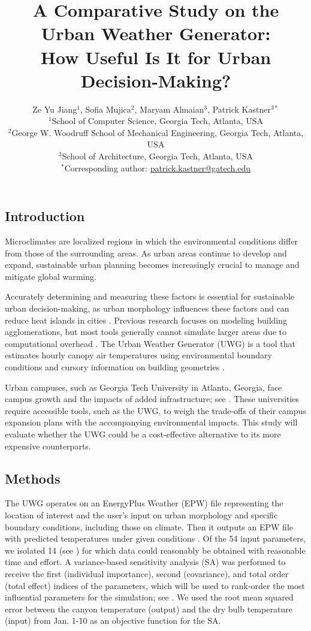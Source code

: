 \documentclass[a4paper, 12pt]{article}
\title{\large\textbf{A Comparative Study on the Urban Weather Generator:\\How Useful Is It for Urban Decision-Making?}}
\author{
\normalsize
Ze Yu Jiang$^{1}$, Sofia Mujica$^{2}$, Maryam Almaian$^{3}$, Patrick Kastner$^{3*}$\\
        \small $^{1}$School of Computer Science, Georgia Tech, Atlanta, USA \\
        \small $^{2}$George W. Woodruff School of Mechanical Engineering, Georgia Tech, Atlanta, USA \\
        \small $^{3}$School of Architecture, Georgia Tech, Atlanta, USA \\
        \small $^{*}$Corresponding author: \href{patrick.kastner@gatech.edu}{patrick.kastner@gatech.edu} \\
}
\date{}
\begin{document}
\maketitle
\thispagestyle{fancy} %

\vspace{-1.5cm}

\subsection*{Introduction}

Microclimates are localized regions in which the environmental conditions differ from those of the surrounding areas. 
As urban areas continue to develop and expand, sustainable urban planning becomes increasingly crucial to manage and mitigate global warming.


Accurately determining and measuring these factors is essential for sustainable urban decision-making, as urban morphology influences these factors and can reduce heat islands in cities \citep{tehrani_predicting_2024}.
Previous research focuses on modeling building agglomerations, but most tools generally cannot simulate larger areas due to computational overhead \citep{singh_recent_2024}.
The Urban Weather Generator (UWG) is a tool that estimates hourly canopy air temperatures using environmental boundary conditions and cursory information on building geometries \citep{mao_urban_2021}.

Urban campuses, such as Georgia Tech University in Atlanta, Georgia, face campus growth and the impacts of added infrastructure; see .
These universities require accessible tools, such as the UWG, to weigh the trade-offs of their campus expansion plans with the accompanying environmental impacts.
This study will evaluate whether the UWG could be a cost-effective alternative to its more expensive counterparts.



\subsection*{Methods}
The UWG operates on an EnergyPlus Weather (EPW) file representing the location of interest and the user's input on urban morphology and specific boundary conditions, including those on climate. 
Then it outputs an EPW file with predicted temperatures under given conditions \citep{nakano2015urban}.
Of the 54 input parameters, we isolated 14 (see )  for which data could reasonably be obtained with reasonable time and effort.
A variance-based sensitivity analysis (SA) \citep{lo_piano_variance-based_2021} was performed to receive the first (individual importance), second (covariance), and total order (total effect) indices of the parameters, which will be used to rank-order the most influential parameters for the simulation; see .
We used the root mean squared error between the canyon temperature (output) and the dry bulb temperature (input) from Jan. 1-10 as an objective function for the SA.
\end{document}
